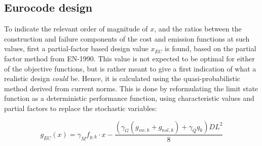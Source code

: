 


\subsection{Eurocode design}
\label{sec:EC_design}
To indicate the relevant order of magnitude of $x$, and the ratios between the construction and failure components of the cost and emission functions at such values, first a partial-factor based design value $x_{EC}$ is found, based on the partial factor method from EN-1990.
This value is not expected to be optimal for either of the objective functions, but is rather meant to give a first indication of what a realistic design \emph{could} be. 
Hence, it is calculated using the quasi-probabilistic method derived from current norms.
This is done by reformulating the limit state function as a deterministic performance function, using characteristic values and partial factors to replace the stochastic variables:

\begin{equation}
    \label{eqn:LSF_EC}
    g_{EC}(x) = \gamma_M f_{y,k} \cdot x - \frac{(\gamma_G(g_{sw,k} + g_{nsl,k}) + \gamma_Q q_k)DL^2}{8}
\end{equation}

